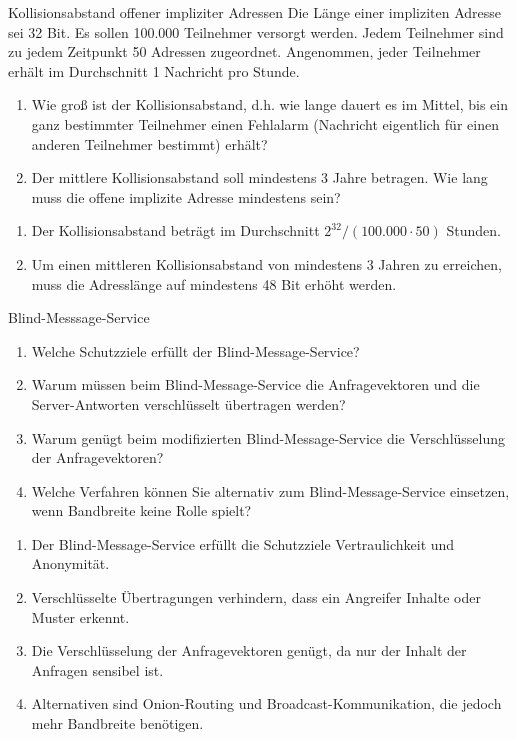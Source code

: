 \documentclass{article}
\begin{document}
\begin{exercise}{Kollisionsabstand offener impliziter Adressen}
  Die Länge einer impliziten Adresse sei 32 Bit. Es sollen 100.000 Teilnehmer versorgt werden. Jedem Teilnehmer sind zu jedem Zeitpunkt 50 Adressen zugeordnet. Angenommen, jeder Teilnehmer erhält im Durchschnitt 1 Nachricht pro Stunde.
  \begin{enumerate}
    \item Wie groß ist der Kollisionsabstand, d.h. wie lange dauert es im Mittel, bis ein ganz bestimmter Teilnehmer einen Fehlalarm (Nachricht eigentlich für einen anderen Teilnehmer bestimmt) erhält?
    \item Der mittlere Kollisionsabstand soll mindestens 3 Jahre betragen. Wie lang muss die offene implizite Adresse mindestens sein?
  \end{enumerate}

  \begin{solution}
    \begin{enumerate}
      \item Der Kollisionsabstand beträgt im Durchschnitt $2^{32} / (100.000 \cdot 50)$ Stunden.
      \item Um einen mittleren Kollisionsabstand von mindestens 3 Jahren zu erreichen, muss die Adresslänge auf mindestens 48 Bit erhöht werden.
    \end{enumerate}
  \end{solution}
\end{exercise}

\setcounter{subsection}{231}
\begin{exercise}{Blind-Messsage-Service}
  \begin{enumerate}
    \item Welche Schutzziele erfüllt der Blind-Message-Service?
    \item Warum müssen beim Blind-Message-Service die Anfragevektoren und die Server-Antworten verschlüsselt übertragen werden?
    \item Warum genügt beim modifizierten Blind-Message-Service die Verschlüsselung der Anfragevektoren?
    \item Welche Verfahren können Sie alternativ zum Blind-Message-Service einsetzen, wenn Bandbreite keine Rolle spielt?
  \end{enumerate}

  \begin{solution}
    \begin{enumerate}
      \item Der Blind-Message-Service erfüllt die Schutzziele Vertraulichkeit und Anonymität.
      \item Verschlüsselte Übertragungen verhindern, dass ein Angreifer Inhalte oder Muster erkennt.
      \item Die Verschlüsselung der Anfragevektoren genügt, da nur der Inhalt der Anfragen sensibel ist.
      \item Alternativen sind Onion-Routing und Broadcast-Kommunikation, die jedoch mehr Bandbreite benötigen.
    \end{enumerate}
  \end{solution}
\end{exercise}
\end{document}
